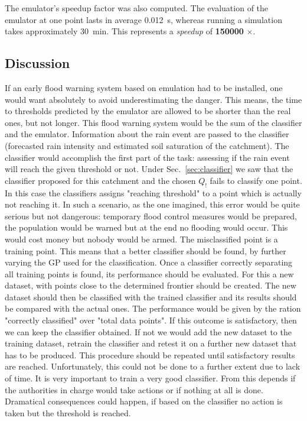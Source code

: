 The emulator's speedup factor was also computed.
The evaluation of the emulator at one point lasts in average \SI{0.012}{\s}, whereas running a simulation takes approximately \SI{30}{\minute}.
This represents a \emph{speedup} of \textbf{\num{150000}} $\bm{\times}$.

\subsection{Discussion}

If an early flood warning system based on emulation had to be installed, one would want absolutely to avoid underestimating the danger.
This means, the time to thresholds predicted by the emulator are allowed to be shorter than the real ones, but not longer.
This flood warning system would be the sum of the classifier and the emulator.
Information about the rain event are passed to the classifier (forecasted rain intensity and estimated soil saturation of the catchment).
The classifier would accomplish the first part of the task: assessing if the rain event will reach the given threshold or not.
Under Sec.~\ref{sec:classifier} we saw that the classifier proposed for this catchment and the chosen $Q_!$ fails to classify one point.
In this case the classifiers assigns "reaching threshold" to a point which is actually not reaching it.
In such a scenario, as the one imagined, this error would be quite serious but not dangerous: temporary flood control measures would be prepared, the population would be warned but at the end no flooding would occur.
This would cost money but nobody would be armed.
The misclassified point is a training point.
This means that a better classifier should be found, by further varying the GP used for the classification.
Once a classifier correctly separating all training points is found, its performance should be evaluated.
For this a new dataset, with points close to the determined frontier should be created.
The new dataset should then be classified with the trained classifier and its results should be compared with the actual ones.
The performance would be given by the ration "correctly classified" over "total data points".
If this outcome is satisfactory, then we can keep the classifier obtained.
If not we would add the new dataset to the training dataset, retrain the classifier and retest it on a further new dataset that has to be produced.
This procedure should be repeated until satisfactory results are reached.
Unfortunately, this could not be done to a further extent due to lack of time.
It is very important to train a very good classifier.
From this depends if the authorities in charge would take actions or if nothing at all is done.
Dramatical consequences could happen, if based on the classifier no action is taken but the threshold is reached.\\

